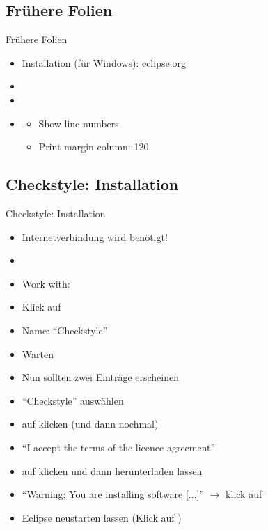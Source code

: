 \documentclass[usepdftitle=false,hyperref={pdfpagelabels=false}]{beamer}
\begin{document}
\subsection{Frühere Folien}
\begin{frame}{Frühere Folien}
    \begin{itemize}
        \item Installation (für Windows): \href{http://www.eclipse.org/}{eclipse.org}
        \item {}
        \item {}
        \item {}
            \begin{itemize}
                \item Show line numbers
                \item Print margin column: 120
            \end{itemize}
    \end{itemize}
\end{frame}

\subsection{Checkstyle: Installation}
\begin{frame}{Checkstyle: Installation}
    \begin{itemize}
        \item Internetverbindung wird benötigt!
        \item {}
        \item Work with: 
        \item Klick auf 
        \item Name: "`Checkstyle"'
        \item Warten
        \item Nun sollten zwei Einträge erscheinen
        \item "`Checkstyle"' auswählen
        \item auf  klicken (und dann nochmal)
        \item "`I accept the terms of the licence agreement"'
        \item auf  klicken und dann herunterladen lassen
        \item "`Warning: You are installing software [...]"' $\rightarrow$ klick auf 
        \item Eclipse neustarten lassen (Klick auf )
    \end{itemize}
\end{frame}
\end{document}
